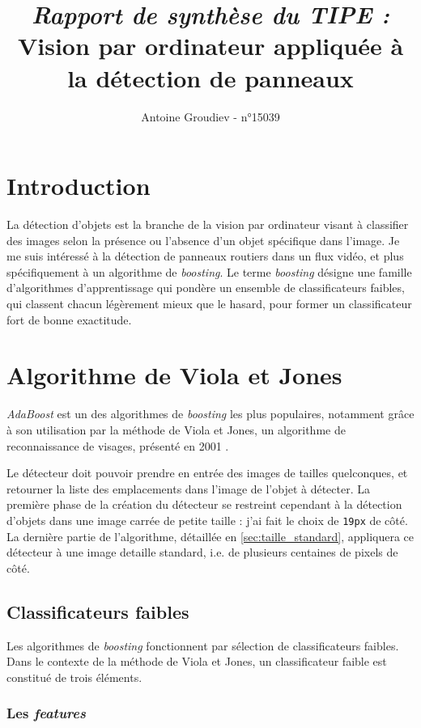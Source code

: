 \documentclass[12pt,a4paper]{article}
\author{Antoine Groudiev - n°15039}
\date{\vspace{-6ex}}
\title{\textit{Rapport de synthèse du TIPE :} \\ Vision par ordinateur appliquée à la détection de panneaux}
\begin{document}
\maketitle

\section*{Introduction}
La détection d'objets est la branche de la vision par ordinateur visant à classifier des images selon la présence ou l'absence d'un objet spécifique dans l'image. Je me suis intéressé à la détection de panneaux routiers dans un flux vidéo, et plus spécifiquement à un algorithme de \textit{boosting}. Le terme \textit{boosting} désigne une famille d'algorithmes d'apprentissage qui pondère un ensemble de classificateurs faibles, qui classent chacun légèrement mieux que le hasard, pour former un classificateur fort de bonne exactitude.

\section{Algorithme de Viola et Jones}
\textit{AdaBoost} est un des algorithmes de \textit{boosting} les plus populaires, notamment grâce à son utilisation par la méthode de Viola et Jones, un algorithme de reconnaissance de visages, présenté en 2001 \cite{viola-jones}.

Le détecteur doit pouvoir prendre en entrée des images de tailles quelconques, et retourner la liste des emplacements dans l'image de l'objet à détecter. La première phase de la création du détecteur se restreint cependant à la détection d'objets dans une image carrée de petite taille : j'ai fait le choix de \texttt{19px} de côté. La dernière partie de l'algorithme, détaillée en \ref{sec:taille_standard}, appliquera ce détecteur à une image detaille standard, i.e. de plusieurs centaines de pixels de côté.

\subsection{Classificateurs faibles}
Les algorithmes de \textit{boosting} fonctionnent par sélection de classificateurs faibles. Dans le contexte de la méthode de Viola et Jones, un classificateur faible est constitué de trois éléments.

\subsubsection{Les \textit{features}}
\end{document}
